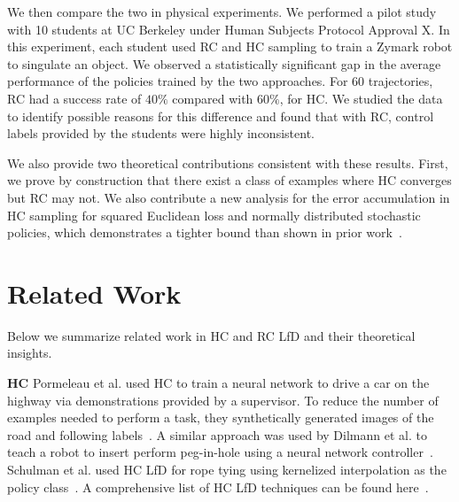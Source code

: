 \documentclass[10pt, conference]{ieeeconf}      %
\newcommand{\ns}{HC }
\begin{document}
We then compare the two in physical experiments. We performed a pilot study with 10 students at UC Berkeley under Human Subjects Protocol Approval X.
In this experiment, each student used RC and HC sampling to train a Zymark robot to singulate an object. We observed a statistically significant gap in the average performance of the policies trained by the two approaches. For $60$  trajectories, RC had a success rate of $40\%$ compared with  $60\%$, for HC. We studied the data to identify possible reasons for this difference and found that with RC, control labels provided by the students were highly inconsistent.


We also provide two theoretical contributions consistent with these results. First, we prove by construction that there exist a class of examples where HC converges but RC may not.  We also contribute a new analysis for the error accumulation in HC sampling for  squared Euclidean loss and normally distributed stochastic policies, which demonstrates a tighter bound than shown in prior work~\cite{ross2010efficient}. 



\section{Related Work}
Below we summarize related work in HC and RC LfD and their theoretical insights. 

\noindent \textbf {\ns}  Pormeleau et al. used \ns to train a neural network to drive a car on the highway via demonstrations provided by a supervisor. To reduce the number of examples needed to perform a task, they synthetically generated images of the road and following labels~\cite{pomerleau1989alvinn}.  A similar approach was used by Dilmann et al. to teach a robot to insert perform peg-in-hole using a neural network controller~\cite{dillmann1995acquisition}. Schulman et al. used HC LfD for rope tying using kernelized interpolation as the policy class~\cite{schulman2016learning}.  A comprehensive list of HC LfD techniques can be found here~\cite{argall2009survey}. 
\end{document}
